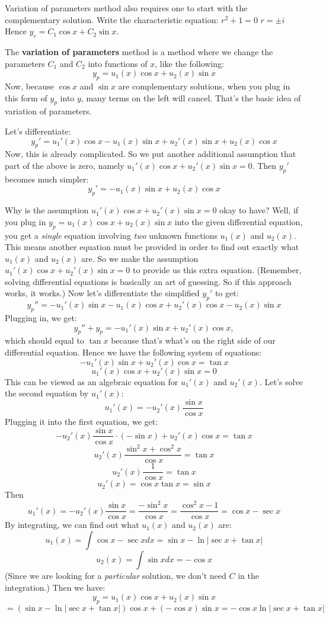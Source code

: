\documentclass[12pt]{report}
\begin{document}
Variation of parameters method also requires one to start with the complementary solution. Write the characteristic equation:
$r^2+1 =0 $
$r = \pm i $
Hence $y_c = C_1 \cos x + C_2 \sin x$.

The \textbf{variation of parameters} method is a method where we change the parameters $C_1$ and $C_2$ into functions of $x$, like the following:
$$y_p = u_1(x) \cos x + u_2(x) \sin x$$
Now, because $\cos x $ and $\sin x$ are complementary solutions, when you plug in this form of $y_p$ into $y$, many terms on the left will cancel. That's the basic idea of variation of parameters.

Let's differentiate:
$$y_p' = u_1'(x) \cos x - u_1(x)\sin x + u_2'(x) \sin x + u_2(x) \cos x$$
Now, this is already complicated. So we put another additional assumption that part of the above is zero, namely $u_1'(x) \cos x  + u_2'(x) \sin x =0$. Then $y_p'$ becomes much simpler:
$$y_p' = - u_1(x)\sin x +  u_2(x) \cos x $$

Why is the assumption $u_1'(x) \cos x  + u_2'(x) \sin x =0$ okay to have? Well, if you plug in $y_p = u_1(x) \cos x + u_2(x) \sin x$ into the given differential equation, you get a \textit{single} equation involving \textit{two} unknown functions $u_1(x)$ and $u_2(x)$. This means another equation must be provided in order to find out exactly what $u_1(x)$ and $u_2(x)$ are. So we make the assumption $u_1'(x) \cos x  + u_2'(x) \sin x =0$ to provide us this extra equation. (Remember, solving differential equations is basically an art of guessing. So if this approach works, it works.)
Now let's differentiate the simplified $y_p'$ to get:
$$y_p'' = - u_1'(x)\sin x - u_1(x)\cos x +  u_2'(x) \cos x  -  u_2(x) \sin x $$
Plugging in, we get:
$$y_p'' + y_p =- u_1'(x)\sin x +  u_2'(x) \cos x , $$
which should equal to $\tan x$ because that's what's on the right side of our differential equation.
Hence we have the following system of equations:
$$- u_1'(x)\sin x +  u_2'(x) \cos x = \tan x $$
$$u_1'(x) \cos x  + u_2'(x) \sin x =0$$
This can be viewed as an algebraic equation for $u_1'(x)$ and $u_2'(x)$. Let's solve the second equation by $u_1'(x)$:
$$u_1'(x) = -u_2'(x) \frac{\sin x}{\cos x}$$
Plugging it into the first equation, we get:
$$-u_2'(x) \frac{\sin x}{\cos x} \cdot (-\sin x) + u_2'(x) \cos x = \tan x $$
$$ u_2'(x) \frac{\sin^2 x + \cos^2 x}{\cos x} = \tan x$$
$$ u_2'(x) \frac{1}{\cos x} = \tan x$$
$$ u_2'(x) = \cos x \tan x = \sin x$$
Then
$$u_1'(x) = -u_2'(x) \frac{\sin x}{\cos x} = \frac{-\sin^2 x}{\cos x} = \frac{\cos^2 x -1}{\cos x} = \cos x - \sec x$$
By integrating, we can find out what $u_1(x)$ and $u_2(x)$ are:
$$u_1(x) = \int \cos x - \sec x dx = \sin x - \ln |\sec x + \tan x | $$
$$ u_2 (x) = \int \sin x dx = -\cos x$$
(Since we are looking for a \textit{particular} solution, we don't need $C$ in the integration.)
Then we have:
$$y_p = u_1(x) \cos x + u_2(x) \sin x$$
$$ = (\sin x - \ln |\sec x + \tan x | ) \cos x  + (-\cos x) \sin x = - \cos x  \ln |\sec x + \tan x | $$
\end{document}
